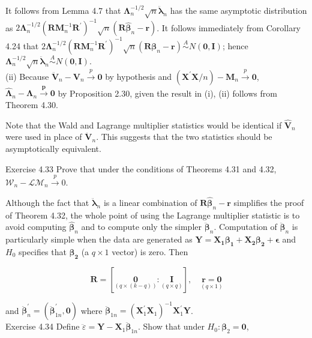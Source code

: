 \documentclass[10pt]{article}
\begin{document}
It follows from Lemma 4.7 that $\boldsymbol{\Lambda}_{n}^{-1 / 2} \sqrt{n} \ddot{\boldsymbol{\lambda}}_{n}$ has the same asymptotic distribution as $2 \boldsymbol{\Lambda}_{n}^{-1 / 2}\left(\mathbf{R} \mathbf{M}_{n}^{-1} \mathbf{R}^{\prime}\right)^{-1} \sqrt{n}\left(\mathbf{R} \hat{\boldsymbol{\beta}}_{n}-\mathbf{r}\right)$. It follows immediately from Corollary 4.24 that $2 \boldsymbol{\Lambda}_{n}^{-1 / 2}\left(\mathbf{R} \mathbf{M}_{n}^{-1} \mathbf{R}^{\prime}\right)^{-1} \sqrt{n}\left(\mathbf{R} \boldsymbol{\beta}_{n}-\mathbf{r}\right) \stackrel{A}{\sim} N(\mathbf{0}, \mathbf{I})$; hence $\boldsymbol{\Lambda}_{n}^{-1 / 2} \sqrt{n} \ddot{\boldsymbol{\lambda}}_{n} \stackrel{A}{\sim} N(\mathbf{0}, \mathbf{I})$.\\
(ii) Because $\ddot{\mathbf{V}}_{n}-\mathbf{V}_{n} \xrightarrow{p} \mathbf{0}$ by hypothesis and $\left(\mathbf{X}^{\prime} \mathbf{X} / n\right)-\mathbf{M}_{n} \xrightarrow{p} \mathbf{0}$, $\hat{\boldsymbol{\Lambda}}_{n}-\boldsymbol{\Lambda}_{n} \xrightarrow{\boldsymbol{p}} \mathbf{0}$ by Proposition 2.30, given the result in (i), (ii) follows from Theorem 4.30.

Note that the Wald and Lagrange multiplier statistics would be identical if $\hat{\mathbf{V}}_{n}$ were used in place of $\ddot{\mathbf{V}}_{n}$. This suggests that the two statistics should be asymptotically equivalent.

Exercise 4.33 Prove that under the conditions of Theorems 4.31 and 4.32, $\mathcal{W}_{n}-\mathcal{L} \mathcal{M}_{n} \xrightarrow{p} 0$.

Although the fact that $\ddot{\boldsymbol{\lambda}}_{n}$ is a linear combination of $\mathbf{R} \hat{\boldsymbol{\beta}}_{n}-\mathbf{r}$ simplifies the proof of Theorem 4.32, the whole point of using the Lagrange multiplier statistic is to avoid computing $\hat{\boldsymbol{\beta}}_{n}$ and to compute only the simpler $\ddot{\boldsymbol{\beta}}_{n}$. Computation of $\ddot{\boldsymbol{\beta}}_{n}$ is particularly simple when the data are generated as $\mathbf{Y}=\mathbf{X}_{\mathbf{1}} \boldsymbol{\beta}_{\mathbf{1}}+\mathbf{X}_{\mathbf{2}} \boldsymbol{\beta}_{\mathbf{2}}+\boldsymbol{\epsilon}$ and $H_{0}$ specifies that $\boldsymbol{\beta}_{\mathbf{2}}$ (a $q \times 1$ vector) is zero. Then

$$
\mathbf{R}=[\underset{(q \times(k-q))}{\mathbf{0}}: \underset{(q \times q)}{\mathbf{I}}], \quad \underset{(q \times 1)}{\mathbf{r}=\mathbf{0}}
$$

and $\ddot{\boldsymbol{\beta}}_{n}^{\prime}=\left(\ddot{\boldsymbol{\beta}}_{1 n}^{\prime}, \mathbf{0}\right)$ where $\ddot{\boldsymbol{\beta}}_{1 n}=\left(\mathbf{X}_{1}^{\prime} \mathbf{X}_{1}\right)^{-1} \mathbf{X}_{1}^{\prime} \mathbf{Y}$.\\
Exercise 4.34 Define $\ddot{\varepsilon}=\mathbf{Y}-\mathbf{X}_{1} \ddot{\boldsymbol{\beta}}_{1 n}$. Show that under $H_{0}: \boldsymbol{\beta}_{2}=\mathbf{0}$,
\end{document}
